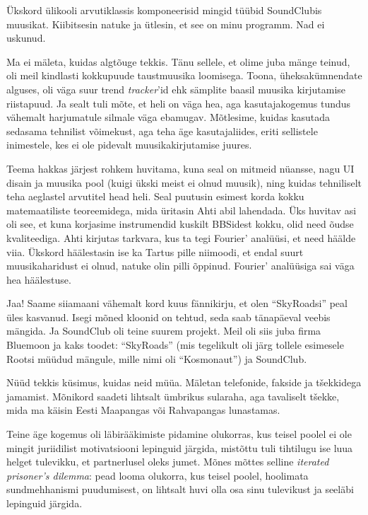 Ükskord ülikooli arvutiklassis komponeerisid mingid tüübid 
Sound{\-}Clubis muusikat. 
Kiibitsesin natuke ja ütlesin, et see on minu programm. Nad ei uskunud. 

Ma ei mäleta, kuidas algtõuge tekkis. Tänu sellele, et olime juba mänge 
teinud, oli meil kindlasti kokkupuude taustmuusika loomisega. 
Toona, üheksakümnendate alguses, oli väga suur trend \emph{tracker}'id ehk 
sämplite baasil muusika kirjutamise riistapuud. Ja 
sealt tuli mõte, et heli on väga hea, aga kasutajakogemus tundus vähemalt 
harjumatule silmale väga ebamugav. Mõtlesime, kuidas kasutada sedasama 
tehnilist võimekust, aga teha äge kasutajaliides, eriti sellistele inimestele, 
kes ei ole pidevalt muusikakirjutamise juures.

Teema hakkas järjest rohkem huvitama, kuna seal on mitmeid nüansse, nagu UI 
disain ja muusika pool (kuigi ükski meist ei olnud muusik), ning
kuidas tehniliselt teha aeglastel arvutitel head heli. Seal puutusin esimest 
korda kokku matemaatiliste teoreemidega, mida üritasin
Ahti abil lahendada. Üks huvitav asi oli see, 
et kuna korjasime instrumendid kuskilt BBSidest kokku, olid 
need õudse kvaliteediga. Ahti kirjutas tarkvara, kus ta 
tegi Fourier' analüüsi, et need häälde viia. Ükskord 
häälestasin ise ka Tartus pille niimoodi, et endal suurt muusikaharidust ei olnud, 
natuke olin pilli õppinud. Fourier' analüüsiga sai väga hea häälestuse. 


Jaa! Saame siiamaani vähemalt kord kuus 
fännikirju, et olen \enquote{SkyRoadsi} peal üles kasvanud. Isegi mõned 
kloonid on tehtud, seda saab tänapäeval veebis mängida. Ja SoundClub oli teine 
suurem projekt. Meil oli siis juba firma Bluemoon ja kaks toodet: 
\enquote{SkyRoads} (mis tegelikult oli järg tollele esimesele Rootsi müüdud mängule, 
mille nimi oli \enquote{Kosmonaut}) ja SoundClub. 

Nüüd tekkis küsimus, kuidas neid müüa. Mäletan
telefonide, fakside ja tšekkidega jamamist. Mõnikord 
saadeti lihtsalt ümbrikus sularaha, aga tavaliselt tšekke, mida ma 
käisin Eesti Maapangas või Rahvapangas lunastamas. 

Teine äge kogemus oli läbirääkimiste pidamine 
olukorras, kus teisel poolel ei ole mingit juriidilist motivatsiooni 
lepinguid järgida, mistõttu tuli tihtilugu ise
luua helget tulevikku, et partnerlusel oleks jumet. Mõnes mõttes 
selline \emph{iterated prisoner's dilemma}: pead looma olukorra, kus teisel poolel, hoolimata sundmehhanismi puudumisest, on lihtsalt huvi olla osa sinu tulevikust ja 
seeläbi lepinguid järgida.

